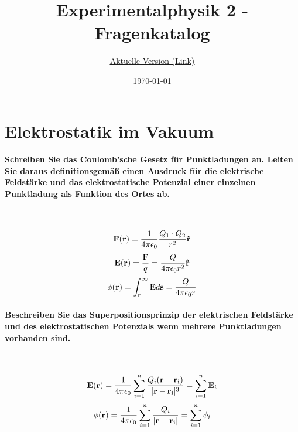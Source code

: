 \documentclass[a4paper, 11pt, ngerman, parskip=half-]{scrartcl}
\title{Experimentalphysik 2 - Fragenkatalog}
\subtitle{\href{https://github.com/etschgi1/Ex2_Fragen/tree/main/output}{\underline{Aktuelle Version (Link)}}}
\date{\today}
\begin{document}
\maketitle

\newpage

\tableofcontents

\newpage

\section{Elektrostatik im Vakuum}

\paragraph{Schreiben Sie das Coulomb'sche Gesetz für Punktladungen an. Leiten Sie daraus
    definitionsgemäß einen Ausdruck für die elektrische Feldstärke und das elektrostatische Potenzial
    einer einzelnen Punktladung als Funktion des Ortes ab.} ~

\begin{equation}
    \bold{F(r)} = \frac{1}{4 \pi \epsilon_0} \frac{Q_1 \cdot Q_2}{r^2} \bold{\hat{r}}
\end{equation}
\begin{equation}
    \bold{E(r)} = \frac{\bold{F}}{q} = \frac{Q}{4 \pi \epsilon_0 r^2} \bold{\hat{r}}
\end{equation}
\begin{equation}
    \phi(\bold{r}) = \int_{\bold{r}}^\infty \bold{E} d\bold{s} = \frac{Q}{4 \pi \epsilon_0 r}
\end{equation}

\paragraph{Beschreiben Sie das Superpositionsprinzip der elektrischen Feldstärke und des
    elektrostatischen Potenzials wenn mehrere Punktladungen vorhanden sind.} ~

\begin{equation}
    \bold{E(r)}
    = \frac{1}{4 \pi \epsilon_0} \sum_{i=1}^n
    \frac{Q_i (\bold{r} - \bold{r_i})}{|\bold{r} - \bold{r_i}|^3}
    = \sum_{i=1}^n \bold{E}_i
\end{equation}
\begin{equation}
    \phi(\bold{r})
    = \frac{1}{4 \pi \epsilon_0} \sum_{i=1}^n \frac{Q_i}{|\bold{r} - \bold{r_i}|}
    = \sum_{i=1}^n \phi_i
\end{equation}
\end{document}

